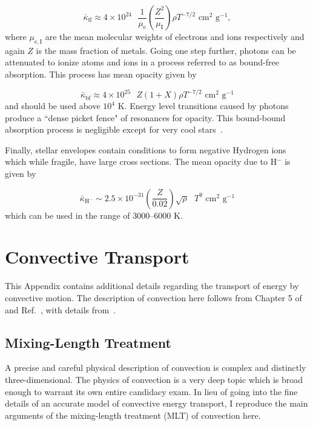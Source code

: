\documentclass[12pt]{article}
\begin{document}
\begin{equation}
    \bar{\kappa}_\mathrm{ff} \approx 4 \times 10^{24}\text{ } \frac{1}{\mu_\mathrm{e}} \left(\frac{Z^2}{\mu_\mathrm{I}} \right) \rho T^{-7/2} \text{ cm}^2 \text{ g}^{-1},
\end{equation}
%
where $\mu_\mathrm{e,I}$ are the mean molecular weights of electrons and ions respectively and again $Z$ is the mass fraction of metals. Going one step further, photons can be attenuated to ionize atoms and ions in a process referred to as bound-free absorption. This process has mean opacity given by

\begin{equation}
    \bar{\kappa}_\mathrm{bf} \approx 4 \times 10^{25} \text{ } Z (1 + X) \rho T^{-7/2} \text{ cm}^2 \text{ g}^{-1}
\end{equation}
%
and should be used above $10^4$ K. Energy level transitions caused by photons produce a ``dense picket fence" of resonances for opacity. This bound-bound absorption process is negligible except for very cool stars~\cite{EracleousPSU}.

Finally, stellar envelopes contain conditions to form negative Hydrogen ions which while fragile, have large cross sections. The mean opacity due to H$^{-}$ is given by

\begin{equation}
    \bar{\kappa}_{\mathrm{H}^-} \sim 2.5 \times 10^{-31} \left(\frac{Z}{0.02}\right) \sqrt{\rho} \text{ } T^9 \text{ cm}^2 \text{ g}^{-1}
\end{equation}
%
which can be used in the range of 3000--6000 K.
%
\pagebreak

\setcounter{equation}{0}
\section{Convective Transport} \label{ap:convection}
This Appendix contains additional details regarding the transport of energy by convective motion. The description of convection here follows from Chapter 5 of~\cite{HK_book} and Ref.~\cite{EracleousPSU}, with details from~\cite{Cox_Giuli_vol1}.

\subsection{Mixing-Length Treatment}
A precise and careful physical description of convection is complex and distinctly three-dimensional. The physics of convection is a very deep topic which is broad enough to warrant its own entire candidacy exam. In lieu of going into the fine details of an accurate model of convective energy transport, I reproduce the main arguments of the mixing-length treatment (MLT) of convection here.
\end{document}
